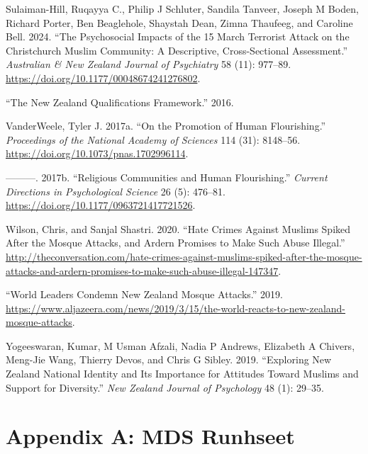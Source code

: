 \documentclass[
]{interact}
\newlength{\cslhangindent}
\newenvironment{CSLReferences}[2] %
 {\begin{list}{}{%
  \setlength{\itemindent}{0pt}
  \setlength{\leftmargin}{0pt}
  \setlength{\parsep}{0pt}
  \ifodd #1
   \setlength{\leftmargin}{\cslhangindent}
   \setlength{\itemindent}{-1\cslhangindent}
  \fi
  \setlength{\itemsep}{#2\baselineskip}}}
 {\end{list}}
\begin{document}
\begin{CSLReferences}{1}{0}
Sulaiman-Hill, Ruqayya C., Philip J Schluter, Sandila Tanveer, Joseph M
Boden, Richard Porter, Ben Beaglehole, Shaystah Dean, Zimna Thaufeeg,
and Caroline Bell. 2024. {``The Psychosocial Impacts of the 15 March
Terrorist Attack on the Christchurch Muslim Community: A Descriptive,
Cross-Sectional Assessment.''} \emph{Australian \& New Zealand Journal
of Psychiatry} 58 (11): 977--89.
\url{https://doi.org/10.1177/00048674241276802}.

{``The New Zealand Qualifications Framework.''} 2016.

VanderWeele, Tyler J. 2017a. {``On the Promotion of Human
Flourishing.''} \emph{Proceedings of the National Academy of Sciences}
114 (31): 8148--56. \url{https://doi.org/10.1073/pnas.1702996114}.

---------. 2017b. {``Religious Communities and Human Flourishing.''}
\emph{Current Directions in Psychological Science} 26 (5): 476--81.
\url{https://doi.org/10.1177/0963721417721526}.

Wilson, Chris, and Sanjal Shastri. 2020. {``Hate Crimes Against
{M}uslims Spiked After the Mosque Attacks, and {A}rdern Promises to Make
Such Abuse Illegal.''}
\url{http://theconversation.com/hate-crimes-against-muslims-spiked-after-the-mosque-attacks-and-ardern-promises-to-make-such-abuse-illegal-147347}.

{``World Leaders Condemn New Zealand Mosque Attacks.''} 2019.
\url{https://www.aljazeera.com/news/2019/3/15/the-world-reacts-to-new-zealand-mosque-attacks}.

Yogeeswaran, Kumar, M Usman Afzali, Nadia P Andrews, Elizabeth A
Chivers, Meng-Jie Wang, Thierry Devos, and Chris G Sibley. 2019.
{``Exploring {N}ew {Z}ealand National Identity and Its Importance for
Attitudes Toward {M}uslims and Support for Diversity.''} \emph{New
Zealand Journal of Psychology} 48 (1): 29--35.

\end{CSLReferences}

\newpage{}

\section{Appendix A: MDS Runhseet}\label{appendix-a-mds-runhseet}
\end{document}
